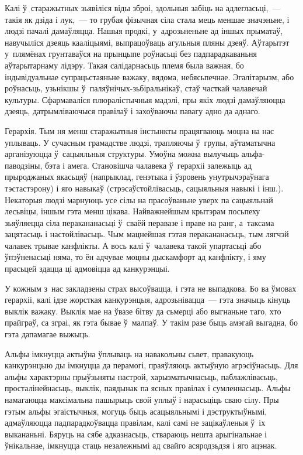 Калі ў~старажытных зьявіліся віды зброі, здольныя забіць на адлегласьці,~--- такія як дзіда і лук,~--- то грубая фізычная сіла стала мець меншае значэньне, і людзі пачалі дамаўляцца. Нашыя продкі, у~адрозьненьне ад іншых прыматаў, навучыліся дзеяць кааліцыямі, выпрацоўваць агульныя пляны дзеяў. Аўтарытэт у~плямёнах грунтаваўся на прынцыпе роўнасьці без падпарадкаваньня аўтарытарнаму лідэру. Такая салідарнасьць племя была важная, бо індывідуальнае супрацьстаяньне важаку, вядома, небясьпечнае. Эгалітарызм, або роўнасьць, узьнікшы ў~паляўнічых-зьбіральнікаў, стаў часткай чалавечай культуры. Сфармаваліся плюралістычныя мадэлі, пры якіх людзі дамаўляюцца дзеяць, датрымліваючыся правілаў і захоўваючы павагу адно да аднаго.

Герархія. Тым ня менш старажытныя інстынкты працягваюць моцна на нас уплываць. У сучасным грамадстве людзі, трапляючы ў~групы, аўтаматычна арганізуюцца ў~сацыяльныя структуры. Умоўна можна вылучыць альфа-паводзіны, бэта і амега. Становішча чалавека ў~герархіі залежыць ад прыроджаных якасьцяў (напрыклад, генэтыка і ўзровень унутрычэраўнага тэстастэрону) і яго навыкаў (стрэсаўстойлівасьць, сацыяльныя навыкі і інш.). Некаторыя людзі марнуюць усе сілы на прасоўваньне уверх па сацыяльнай лесьвіцы, іншым гэта менш цікава. Найважнейшым крытэрам посьпеху зьяўляецца сіла перакананасьці ў~сваёй перавазе і праве на ранг, а~таксама зацятасьць і настойлівасьць. Чым мацнейшая гэтая перакананасьць, тым лягчэй чалавек трывае канфлікты. А вось калі ў~чалавека такой упартасьці або ўпэўненасьці няма, то ён адчувае моцны дыскамфорт ад канфлікту, і яму прасьцей здацца ці адмовіцца ад канкурэнцыі.

У кожным з~нас закладзены страх высоўвацца, і гэта не выпадкова. Бо ва ўмовах герархіі, калі ідзе жорсткая канкурэнцыя, адрозьнівацца~--- гэта значыць кінуць выклік важаку. Выклік мае на ўвазе бітву да сьмерці або выгнаньне таго, хто прайграў, са зграі, як гэта бывае ў~малпаў. У такім разе быць амэгай выгадна, бо гэта дапамагае выжыць.

Альфы імкнуцца актыўна ўплываць на навакольны сьвет, правакуюць канкурэнцыю ды імкнуцца да перамогі, праяўляюць актыўную агрэсіўнасьць. Для альфы характэрны прыўзьняты настрой, харызматычнасьць, паблажлівасьць, просталінейнасьць, выклік, паядынак па ясных правілах і сумленнасьць. Альфы намагаюцца максімальна пашырыць свой уплыў і нарасьціць сваю сілу. Пры гэтым альфы эгаістычныя, могуць быць асацыяльнымі і дэструктыўнымі, адмаўляюцца падпарадкоўвацца правілам, калі самі не зацікаўленыя ў~іх выкананьні. Бяруць на сябе адказнасьць, ствараюць нешта арыгінальнае і ўнікальнае, імкнуцца стаць незалежнымі ад свайго асяродзьдзя і яго ацэнак.


